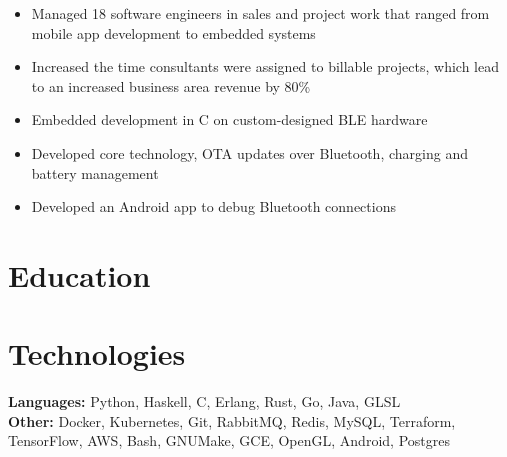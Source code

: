 \documentclass{cv_doc}
\begin{document}

\begin{itemize}[label={\tiny\raisebox{1ex}{\textbullet}}]
  \item {Managed 18 software engineers in sales and project work that ranged
  from mobile app development to embedded systems}
  \item {Increased the time consultants were assigned to billable projects,
  which lead to an increased business area revenue by 80\%}
\end{itemize}


\begin{itemize}[label={\tiny\raisebox{1ex}{\textbullet}}]
  \item {Embedded development in C on custom-designed BLE hardware}
  \item {Developed core technology, OTA updates over Bluetooth, charging
  and battery management}
  \item {Developed an Android app to debug Bluetooth connections}
\end{itemize}

\vspace{0.3cm}

\section*{Education}


\vspace{0.3cm}

\section*{Technologies}

\textbf{Languages:} Python, Haskell, C, Erlang, Rust, Go, Java, GLSL \\
\textbf{Other:} Docker, Kubernetes, Git, RabbitMQ, Redis, MySQL, Terraform, TensorFlow, AWS, Bash, GNUMake, GCE, OpenGL,
Android, Postgres
\end{document}
